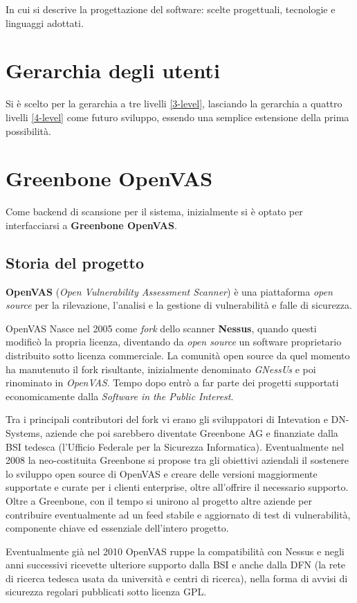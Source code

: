 In cui si descrive la progettazione del software: scelte progettuali, tecnologie e linguaggi adottati.

\section{Gerarchia degli utenti}
Si è scelto per la gerarchia a tre livelli \ref{3-level}, lasciando la gerarchia a quattro livelli \ref{4-level} come futuro sviluppo, essendo una semplice estensione della prima possibilità.

\section{Greenbone OpenVAS}
Come backend di scansione per il sistema, inizialmente si è optato per interfacciarsi a \textbf{Greenbone OpenVAS}.

\subsection{Storia del progetto}
\textbf{OpenVAS} (\emph{Open Vulnerability Assessment Scanner}) è una piattaforma \emph{open source} per la rilevazione, l'analisi e la gestione di vulnerabilità e falle di sicurezza.

OpenVAS Nasce nel 2005 come \emph{fork} dello scanner \textbf{Nessus}, quando questi modificò la propria licenza, diventando da \emph{open source} un software proprietario distribuito sotto licenza commerciale. La comunità open source da quel momento ha manutenuto il fork risultante, inizialmente denominato \emph{GNessUs} e poi rinominato in \emph{OpenVAS}. Tempo dopo entrò a far parte dei progetti supportati economicamente dalla \emph{Software in the Public Interest}.

Tra i principali contributori del fork vi erano gli sviluppatori di Intevation e DN-Systems, aziende che poi sarebbero diventate Greenbone AG e finanziate dalla BSI tedesca (l'Ufficio Federale per la Sicurezza Informatica). Eventualmente nel 2008 la neo-costituita Greenbone si propose tra gli obiettivi aziendali il sostenere lo sviluppo open source di OpenVAS e creare delle versioni maggiormente supportate e curate per i clienti enterprise, oltre all'offrire il necessario supporto. Oltre a Greenbone, con il tempo si unirono al progetto altre aziende per contribuire eventualmente ad un feed stabile e aggiornato di test di vulnerabilità, componente chiave ed essenziale dell'intero progetto.

Eventualmente già nel 2010 OpenVAS ruppe la compatibilità con Nessus e negli anni successivi ricevette ulteriore supporto dalla BSI e anche dalla DFN (la rete di ricerca tedesca usata da università e centri di ricerca), nella forma di avvisi di sicurezza regolari pubblicati sotto licenza GPL.

